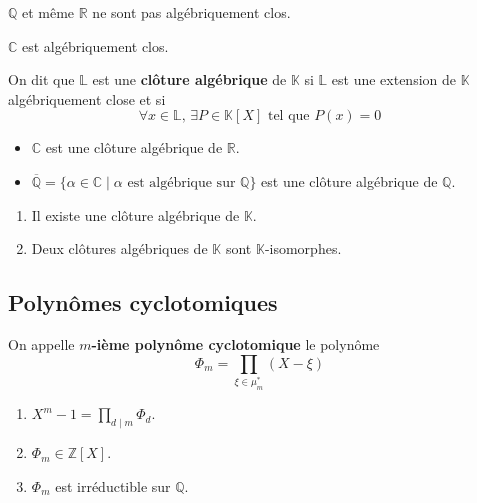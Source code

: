 	\begin{cexample}
		$\mathbb{Q}$ et même $\mathbb{R}$ ne sont pas algébriquement clos.
	\end{cexample}

	\begin{theorem}
		$\mathbb{C}$ est algébriquement clos.
	\end{theorem}

	\begin{definition}
		On dit que $\mathbb{L}$ est une \textbf{clôture algébrique} de $\mathbb{K}$ si $\mathbb{L}$ est une extension de $\mathbb{K}$ algébriquement close et si
		\[ \forall x \in \mathbb{L}, \, \exists P \in \mathbb{K}[X] \text{ tel que } P(x) = 0 \]
	\end{definition}

	\begin{example}
		\begin{itemize}
			\item $\mathbb{C}$ est une clôture algébrique de $\mathbb{R}$.
			\item $\overline{\mathbb{Q}} = \{ \alpha \in \mathbb{C} \mid \alpha \text{ est algébrique sur } \mathbb{Q} \}$ est une clôture algébrique de $\mathbb{Q}$.
		\end{itemize}
	\end{example}

	\begin{theorem}[Steinitz]
		\begin{enumerate}[label=(\roman*)]
			\item Il existe une clôture algébrique de $\mathbb{K}$.
			\item Deux clôtures algébriques de $\mathbb{K}$ sont $\mathbb{K}$-isomorphes.
		\end{enumerate}
	\end{theorem}

	\subsection{Polynômes cyclotomiques}

	\begin{definition}
		On appelle \textbf{$m$-ième polynôme cyclotomique} le polynôme
		\[ \Phi_m = \prod_{\xi \in \mu_m^*} (X - \xi) \]
	\end{definition}

	\begin{theorem}
		\begin{enumerate}[label=(\roman*)]
			\item $X^m - 1 = \prod_{d \mid m} \Phi_d$.
			\item $\Phi_m \in \mathbb{Z}[X]$.
			\item $\Phi_m$ est irréductible sur $\mathbb{Q}$.
		\end{enumerate}
	\end{theorem}

